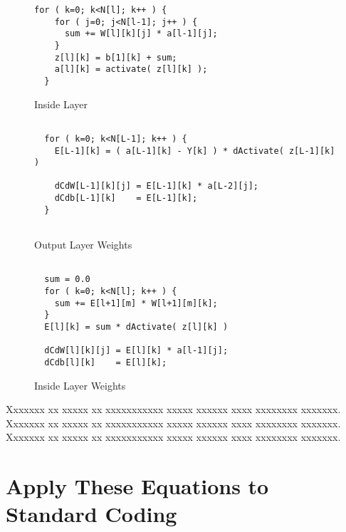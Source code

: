 \documentclass{article}
\begin{document}
\begin{figure}[h]
\caption{Inside Layer}
\begin{Verbatim}[frame=single]
  for ( k=0; k<N[l]; k++ ) {
    for ( j=0; j<N[l-1]; j++ ) {
      sum += W[l][k][j] * a[l-1][j];
    }
    z[l][k] = b[1][k] + sum;
    a[l][k] = activate( z[l][k] );
  }
\end{Verbatim}
\end{figure}

\begin{figure}[h]
\caption{Output Layer Weights}
\begin{Verbatim}[frame=single]

  for ( k=0; k<N[L-1]; k++ ) {
    E[L-1][k] = ( a[L-1][k] - Y[k] ) * dActivate( z[L-1][k] )

    dCdW[L-1][k][j] = E[L-1][k] * a[L-2][j];
    dCdb[L-1][k]    = E[L-1][k];
  }
  
\end{Verbatim}
\end{figure}


\begin{figure}[h]
\caption{Inside Layer Weights}
\begin{Verbatim}[frame=single]

  sum = 0.0
  for ( k=0; k<N[l]; k++ ) {
    sum += E[l+1][m] * W[l+1][m][k];
  }
  E[l][k] = sum * dActivate( z[l][k] )

  dCdW[l][k][j] = E[l][k] * a[l-1][j];
  dCdb[l][k]    = E[l][k];

\end{Verbatim}
\end{figure}


Xxxxxxx xx xxxxx xx xxxxxxxxxxx xxxxx xxxxxx xxxx xxxxxxxx xxxxxxx.
Xxxxxxx xx xxxxx xx xxxxxxxxxxx xxxxx xxxxxx xxxx xxxxxxxx xxxxxxx.
Xxxxxxx xx xxxxx xx xxxxxxxxxxx xxxxx xxxxxx xxxx xxxxxxxx xxxxxxx.

\section{Apply These Equations to Standard Coding}
\end{document}
